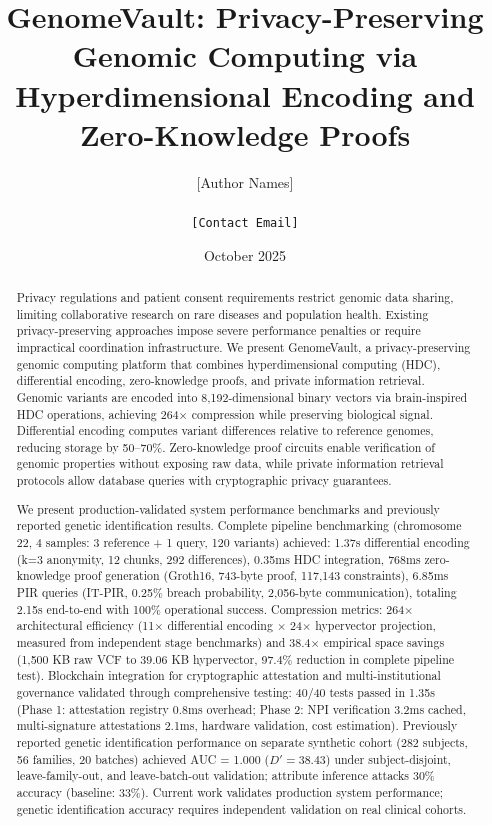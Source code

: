 \documentclass[11pt,letterpaper]{article}
\title{GenomeVault: Privacy-Preserving Genomic Computing via Hyperdimensional Encoding and Zero-Knowledge Proofs}
\author{
    [Author Names]\\
    [Institution Names]\\
    \texttt{[Contact Email]}
}
\date{October 2025}
\begin{document}
\maketitle

\begin{abstract}
Privacy regulations and patient consent requirements restrict genomic data sharing, limiting collaborative research on rare diseases and population health. Existing privacy-preserving approaches impose severe performance penalties or require impractical coordination infrastructure. We present GenomeVault, a privacy-preserving genomic computing platform that combines hyperdimensional computing (HDC), differential encoding, zero-knowledge proofs, and private information retrieval. Genomic variants are encoded into 8,192-dimensional binary vectors via brain-inspired HDC operations, achieving 264$\times$ compression while preserving biological signal. Differential encoding computes variant differences relative to reference genomes, reducing storage by 50--70\%. Zero-knowledge proof circuits enable verification of genomic properties without exposing raw data, while private information retrieval protocols allow database queries with cryptographic privacy guarantees.

We present production-validated system performance benchmarks and previously reported genetic identification results. Complete pipeline benchmarking (chromosome 22, 4 samples: 3 reference + 1 query, 120 variants) achieved: 1.37s differential encoding (k=3 anonymity, 12 chunks, 292 differences), 0.35ms HDC integration, 768ms zero-knowledge proof generation (Groth16, 743-byte proof, 117,143 constraints), 6.85ms PIR queries (IT-PIR, 0.25\% breach probability, 2,056-byte communication), totaling 2.15s end-to-end with 100\% operational success. Compression metrics: 264$\times$ architectural efficiency (11$\times$ differential encoding $\times$ 24$\times$ hypervector projection, measured from independent stage benchmarks) and 38.4$\times$ empirical space savings (1,500 KB raw VCF to 39.06 KB hypervector, 97.4\% reduction in complete pipeline test). Blockchain integration for cryptographic attestation and multi-institutional governance validated through comprehensive testing: 40/40 tests passed in 1.35s (Phase 1: attestation registry 0.8ms overhead; Phase 2: NPI verification 3.2ms cached, multi-signature attestations 2.1ms, hardware validation, cost estimation). Previously reported genetic identification performance on separate synthetic cohort (282 subjects, 56 families, 20 batches) achieved AUC = 1.000 ($D' = 38.43$) under subject-disjoint, leave-family-out, and leave-batch-out validation; attribute inference attacks 30\% accuracy (baseline: 33\%). Current work validates production system performance; genetic identification accuracy requires independent validation on real clinical cohorts.
\end{abstract}
\end{document}
